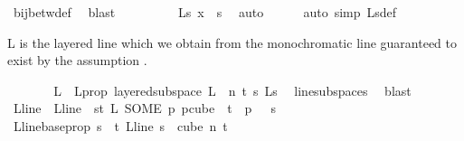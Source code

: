 \begin{isabellebody}
\ bij{\isacharunderscore}{\kern0pt}betw{\isacharunderscore}{\kern0pt}def\ \isamarkupfalse%
\ blast\isanewline
\ \ \ \ \ \ \isamarkupfalse%
\ \isamarkupfalse%
\ {\isachardoublequoteopen}{\isasymchi}L{\isacharunderscore}{\kern0pt}s\ x\ {\isasymin}\ {\isacharbraceleft}{\kern0pt}{\isachardot}{\kern0pt}{\isachardot}{\kern0pt}{\isacharless}{\kern0pt}s{\isacharbraceright}{\kern0pt}{\isachardoublequoteclose}\ \isamarkupfalse%
\ auto\isanewline
\ \ \ \ \isamarkupfalse%
\ {\isacharparenleft}{\kern0pt}auto\ simp{\isacharcolon}{\kern0pt}\ {\isasymchi}L{\isacharunderscore}{\kern0pt}s{\isacharunderscore}{\kern0pt}def{\isacharparenright}{\kern0pt}%
\begin{isamarkuptext}%
L is the layered line which we obtain from the monochromatic line guaranteed to
    exist by the assumption .%
\end{isamarkuptext}\isamarkuptrue%
\ \ \ \ \isamarkupfalse%
\ \isamarkupfalse%
\ L\ \ L{\isacharunderscore}{\kern0pt}prop{\isacharcolon}{\kern0pt}\ {\isachardoublequoteopen}layered{\isacharunderscore}{\kern0pt}subspace\ L\ {}\ n\ t\ s\ {\isasymchi}L{\isacharunderscore}{\kern0pt}s{\isachardoublequoteclose}\ \isamarkupfalse%
\ line{\isacharunderscore}{\kern0pt}subspace{\isacharunderscore}{\kern0pt}s\ \isamarkupfalse%
\ blast\isanewline
\ \ \ \ \isamarkupfalse%
\ L{\isacharunderscore}{\kern0pt}line\ \ {\isachardoublequoteopen}L{\isacharunderscore}{\kern0pt}line\ {\isasymequiv}\ {\isacharparenleft}{\kern0pt}{\isasymlambda}s{\isasymin}{\isacharbraceleft}{\kern0pt}{\isachardot}{\kern0pt}{\isachardot}{\kern0pt}{\isacharless}{\kern0pt}t{\isacharplus}{\kern0pt}{}{\isacharbraceright}{\kern0pt}{\isachardot}{\kern0pt}\ L\ {\isacharparenleft}{\kern0pt}SOME\ p{\isachardot}{\kern0pt}\ p{\isasymin}cube\ {}\ {\isacharparenleft}{\kern0pt}t{\isacharplus}{\kern0pt}{}{\isacharparenright}{\kern0pt}\ {\isasymand}\ p\ {}\ {\isacharequal}{\kern0pt}\ s{\isacharparenright}{\kern0pt}{\isacharparenright}{\kern0pt}{\isachardoublequoteclose}\isanewline
\ \ \ \ \isamarkupfalse%
\ L{\isacharunderscore}{\kern0pt}line{\isacharunderscore}{\kern0pt}base{\isacharunderscore}{\kern0pt}prop{\isacharcolon}{\kern0pt}\ {\isachardoublequoteopen}{\isasymforall}s\ {\isasymin}\ {\isacharbraceleft}{\kern0pt}{\isachardot}{\kern0pt}{\isachardot}{\kern0pt}{\isacharless}{\kern0pt}t{\isacharplus}{\kern0pt}{}{\isacharbraceright}{\kern0pt}{\isachardot}{\kern0pt}\ L{\isacharunderscore}{\kern0pt}line\ s\ {\isasymin}\ cube\ n\ {\isacharparenleft}{\kern0pt}t{\isacharplus}{\kern0pt}{}{\isacharparenright}{\kern0pt}{\isachardoublequoteclose}\ \isanewline

\end{isabellebody}
